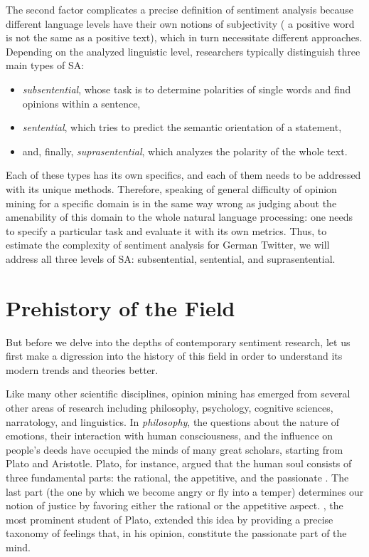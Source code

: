 The second factor complicates a precise definition of sentiment
analysis because different language levels have their own notions of
subjectivity (\eg{} a positive word is not the same as a positive
text), which in turn necessitate different approaches.  Depending on
the analyzed linguistic level, researchers typically distinguish three
main types of SA\@:
\begin{itemize}
  \item\emph{subsentential}, whose task is to determine polarities of
    single words and find opinions within a sentence,
  \item\emph{sentential}, which tries to predict the semantic
    orientation of a statement,
  \item and, finally, \emph{suprasentential}, which analyzes the
    polarity of the whole text.
\end{itemize}
Each of these types has its own specifics, and each of them needs to
be addressed with its unique methods.  Therefore, speaking of general
difficulty of opinion mining for a specific domain is in the same way
wrong as judging about the amenability of this domain to the whole
natural language processing: one needs to specify a particular task
and evaluate it with its own metrics.  Thus, to estimate the
complexity of sentiment analysis for German Twitter, we will address
all three levels of SA\@: subsentential, sentential, and
suprasentential.

\section{Prehistory of the Field}

But before we delve into the depths of contemporary sentiment
research, let us first make a digression into the history of this
field in order to understand its modern trends and theories better.

Like many other scientific disciplines, opinion mining has emerged
from several other areas of research including philosophy, psychology,
cognitive sciences, narratology, and linguistics.  In
\emph{philosophy}, the questions about the nature of emotions, their
interaction with human consciousness, and the influence on people's
deeds have occupied the minds of many great scholars, starting from
Plato and Aristotle.  Plato, for instance, argued that the human soul
consists of three fundamental parts: the rational, the appetitive, and
the passionate \citep[see][Book~IV]{Plato:91}.  The last part (the one
by which we become angry or fly into a temper) determines our notion
of justice by favoring either the rational or the appetitive aspect.
\citet{Aristotle:54}, the most prominent student of Plato, extended
this idea by providing a precise taxonomy of feelings that, in his
opinion, constitute the passionate part of the mind.

